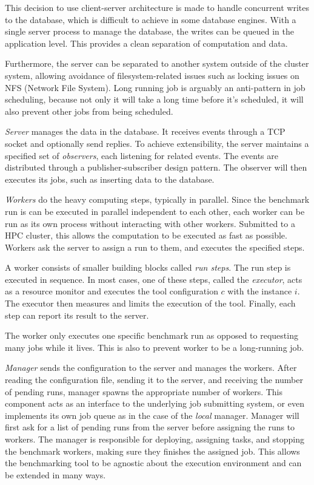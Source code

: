 This decision to use client-server architecture is made to handle concurrent writes to the database, which is difficult to achieve in some database engines.
With a single server process to manage the database, the writes can be queued in the application level.
This provides a clean separation of computation and data.

Furthermore, the server can be separated to another system outside of the cluster system, allowing avoidance of filesystem-related issues such as locking issues on NFS (Network File System).
Long running job is arguably an anti-pattern in job scheduling, because not only it will take a long time before it's scheduled, it will also prevent other jobs from being scheduled.

\emph{Server} manages the data in the database.
It receives events through a TCP socket and optionally send replies.
To achieve extensibility, the server maintains a specified set of \emph{observers}, each listening for related events.
The events are distributed through a publisher-subscriber design pattern.
The observer will then executes its jobs, such as inserting data to the database.

\emph{Workers} do the heavy computing steps, typically in parallel.
Since the benchmark run is can be executed in parallel independent to each other, each worker can be run as its own process without interacting with other workers.
Submitted to a HPC cluster, this allows the computation to be executed as fast as possible.
Workers ask the server to assign a run to them, and executes the specified steps.

A worker consists of smaller building blocks called \emph{run steps}.
The run step is executed in sequence.
In most cases, one of these steps, called the \emph{executor}, acts as a resource monitor and executes the tool configuration $c$ with the instance $i$.
The executor then measures and limits the execution of the tool.
Finally, each step can report its result to the server.

The worker only executes one specific benchmark run as opposed to requesting many jobs while it lives.
This is also to prevent worker to be a long-running job.

\emph{Manager} sends the configuration to the server and manages the workers.
After reading the configuration file, sending it to the server, and receiving the number of pending runs, manager spawns the appropriate number of workers.
This component acts as an interface to the underlying job submitting system, or even implements its own job queue as in the case of the \emph{local} manager.
Manager will first ask for a list of pending runs from the server before assigning the runs to workers.
The manager is responsible for deploying, assigning tasks, and stopping the benchmark workers, making sure they finishes the assigned job.
This allows the benchmarking tool to be agnostic about the execution environment and can be extended in many ways.

